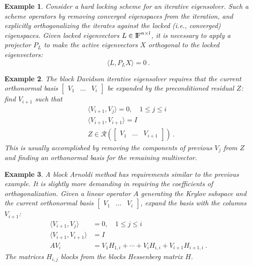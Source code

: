 \documentclass[12pt,letterpaper]{SANDreport}
\theoremstyle{example}
\newtheorem{example}{Example}[section]
\newcommand{\inner}[2]{\langle #1,#2 \rangle}
\newcommand{\range}[1]{\mathcal{R}(#1)}
\begin{document}
\begin{example}
Consider a hard locking scheme for an iterative eigensolver. Such a scheme operators by
removing converged eigenspaces from the iteration, and explicitly orthogonalizing the
iterates against the locked (i.e., converged) eigenspaces.  Given locked eigenvectors $L
\in {\rm I\kern-.16em F}^{n \times l}$, it is necessary to apply a projector $P_L$ to make the active
eigenvectors $X$ orthogonal to the locked eigenvectors:
\[
\inner{L}{P_L X} = 0\ .
\]
\end{example}

\begin{example}
The block Davidson iterative eigensolver requires that the current
orthonormal basis $\begin{bmatrix} V_1&\ldots&V_i\end{bmatrix}$ be expanded by the 
  preconditioned residual $Z$: find $V_{i+1}$ such that 
\begin{align*}
  &\inner{V_{i+1}}{V_{j}} = 0, \quad 1 \leq j \leq i \\
  &\inner{V_{i+1}}{V_{i+1}} = I \\
  &Z \in \range{\begin{bmatrix}V_1&\ldots&V_{i+1}\end{bmatrix}}\ .
\end{align*}
This is usually accomplished by removing the components of previous $V_j$ from
$Z$ and finding an orthonormal basis for the remaining multivector. 
\end{example}

\begin{example}
A block Arnoldi method has requirements similar to the previous
example. It is slightly more demanding in requiring the coefficients of
orthogonalization. Given a linear operator $A$ generating the Krylov subspace
and the current orthonormal basis $\begin{bmatrix}V_1 & \ldots & V_i
\end{bmatrix}$, expand the basis with the columns $V_{i+1}$: 
\begin{align*}
  \inner{V_{i+1}}{V_{j}} &= 0, \quad 1 \leq j \leq i \\
  \inner{V_{i+1}}{V_{i+1}} &= I \\
  A V_i &= V_1 H_{1,i} + \cdots + V_i H_{i,i} + V_{i+1} H_{i+1,i}\ .
\end{align*}
The matrices $H_{i,j}$ blocks from the blocks Hessenberg matrix $H$.
\end{example}
\end{document}
